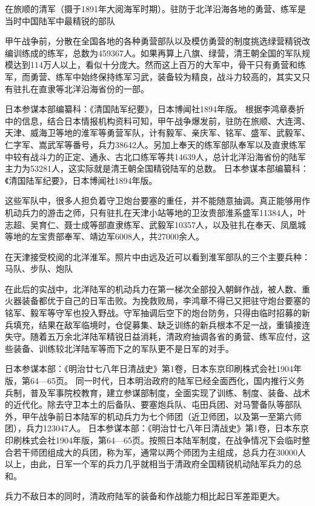 \documentclass[12pt,UTF8]{ctexbook}
\begin{document}
在旅顺的清军（摄于1891年大阅海军时期）。驻防于北洋沿海各地的勇营、练军是当时中国陆军中最精锐的部队

甲午战争前，分散在全国各地的各种勇营部队以及模仿勇营的制度挑选绿营精锐改编训练成的练军，总数为459367人。如果再算上八旗、绿营，清王朝全国的军队规模达到114万人以上，看似十分庞大。然而这上百万的大军中，骨干只有勇营和练军，而勇营、练军中始终保持练军习武，装备较为精良，战斗力较高的，其实又只有驻扎在直隶等北洋沿海省份的一部。

日本参谋本部编纂科：《清国陆军纪要》，日本博闻社1894年版。
根据李鸿章奏折中的信息，结合日本情报机构资料可知，甲午战争爆发前，驻防在旅顺、大连湾、天津、威海卫等地的淮军等勇营军队，计有毅军、亲庆军、铭军、盛军、武毅军、仁字军、嵩武军等番号，兵力38642人。另加上奉天的练军部队奉军以及直隶练军中较有战斗力的正定、通永、古北口练军等共14639人，总计北洋沿海省份的陆军主力为53281人，这实际就是清王朝全国精锐陆军的总数。 日本参谋本部编纂科：《清国陆军纪要》，日本博闻社1894年版。

这些军队中，很多人担负着守卫炮台要塞的重任，并不能随意抽调。真正能够用作机动兵力的游击之师，只有驻扎在天津小站等地的卫汝贵部淮系盛军11384人，叶志超、吴育仁、聂士成等部直隶练军、武毅军10357人，以及驻扎在奉天、凤凰城等地的左宝贵部奉军、靖边军6008人，共27000余人。


在天津接受校阅的北洋淮军。照片中由远及近可以看到淮军部队的三个主要兵种：马队、步队、炮队

在此后的实战中，北洋陆军的机动兵力在第一梯次全部投入朝鲜作战，被人数、重火器装备都优于自己的日军击败。为挽救败局，李鸿章不得已又把驻守炮台要塞的铭军、毅军等守军也投入野战。守军抽调后空下的炮台防务，只得由临时招募的新兵填充，结果在敌军临境时，仓促募集、缺乏训练的新兵根本不足一战，重镇接连失守。随着五万余北洋陆军精锐日益消耗，清政府抽调各省的勇营、练军应付，这些装备、训练较北洋陆军等而下之的军队更不是日军的对手。

日本参谋本部：《明治廿七八年日清战史》第1卷，日本东京印刷株式会社1904年版，第64—65页。
同一时代，日本明治政府的陆军已经全面西化，国内推行义务兵制，普及军事院校教育，建立参谋部制度，全面实现了训练、制度、装备、战术的近代化。除去守卫本土的后备队、要塞炮兵队、屯田兵团、对马警备队等部队外，甲午战争前日本陆军的机动兵力为七个师团（近卫师团，以及第一至第六师团），兵力123047人。 日本参谋本部：《明治廿七八年日清战史》第1卷，日本东京印刷株式会社1904年版，第64—65页。按照日本陆军制度，在战争情况下会临时整合若干师团组成大的兵团，称为军，通常以两个师团为主组成，总兵力在30000人以上，由此，日军一个军的兵力几乎就相当于清政府全国精锐机动陆军兵力的总和。

兵力不敌日本的同时，清政府陆军的装备和作战能力相比起日军差距更大。
\end{document}
